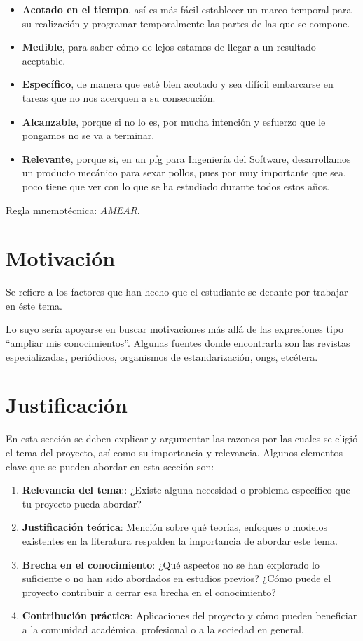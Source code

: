\begin{itemize}
    \item \textbf{Acotado en el tiempo}, así es más fácil establecer un marco temporal para su realización y programar temporalmente las partes de las que se compone.
    \item \textbf{Medible}, para saber cómo de lejos estamos de llegar a un resultado aceptable.
    \item \textbf{Específico}, de manera que esté bien acotado y sea difícil embarcarse en tareas que no nos acerquen a su consecución.
    \item \textbf{Alcanzable}, porque si no lo es, por mucha intención y esfuerzo que le pongamos no se va a terminar.
    \item \textbf{Relevante}, porque si, en un \gls{pfg} para Ingeniería del Software, desarrollamos un producto mecánico para sexar pollos, pues por muy importante que sea, poco tiene que ver con lo que se ha estudiado durante todos estos años.
\end{itemize}

Regla mnemotécnica: \textit{AMEAR}.

\section{Motivación}

Se refiere a los factores que han hecho que el estudiante se decante por trabajar en éste tema.

Lo suyo sería apoyarse en buscar motivaciones más allá de las expresiones tipo \enquote{ampliar mis conocimientos}. Algunas fuentes donde encontrarla son las revistas especializadas, periódicos, organismos de estandarización, \glspl{ong}, etcétera.

\section{Justificación}

En esta sección se deben explicar y argumentar las razones por las cuales se eligió el tema del proyecto, así como su importancia y relevancia. Algunos elementos clave que se pueden abordar en esta sección son:

\begin{enumerate}
    \item \textbf{Relevancia del tema}:: ¿Existe alguna necesidad o problema específico que tu proyecto pueda abordar?
    \item \textbf{Justificación teórica}: Mención sobre qué teorías, enfoques o modelos existentes en la literatura respalden la importancia de abordar este tema.
    \item \textbf{Brecha en el conocimiento}: ¿Qué aspectos no se han explorado lo suficiente o no han sido abordados en estudios previos? ¿Cómo puede el proyecto contribuir a cerrar esa brecha en el conocimiento?
    \item \textbf{Contribución práctica}: Aplicaciones del proyecto y cómo pueden beneficiar a la comunidad académica, profesional o a la sociedad en general.
\end{enumerate}

